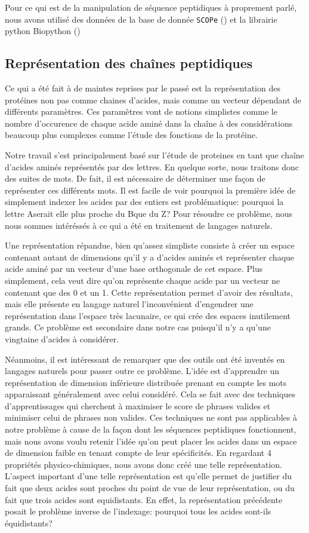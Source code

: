 \documentclass[a4paper,11pt]{article}
\begin{document}
Pour ce qui est de la manipulation de séquence peptidiques à proprement parlé,
nous avons utilisé des données de la base de donnée \texttt{SCOPe}
(\cite{fox2014scope}) et la librairie python Biopython (\cite{Cock01062009})

\subsection{Représentation des chaînes peptidiques}

Ce qui a été fait à de maintes reprises par le passé est la représentation des
protéines non pas comme chaines d'acides, mais comme un vecteur dépendant de
différents paramètres. Ces paramètres vont de notions simplistes comme le nombre
d'occurence de chaque acide aminé dans la chaîne à des considérations beaucoup
plus complexes comme l'étude des fonctions de la protéine.

Notre travail s'est principalement basé sur l'étude de proteines en tant que
chaîne d'acides aminés représentés par des lettres. En quelque sorte, nous traitons donc des suites de \og
mots\fg. De fait, il est nécessaire de déterminer une façon de représenter ces
différents mots. Il est facile de voir pourquoi la première idée de simplement
indexer les acides par des entiers est problématique: pourquoi la lettre \og
A\fg serait elle plus proche du \og B\fg que du \og Z\fg? Pour résoudre ce
problème, nous nous sommes intéréssés à ce qui a été en traitement de langages
naturels.

Une représentation répandue, bien qu'assez simpliste consiste à créer un espace
contenant autant de dimensions qu'il y a d'acides aminés et représenter chaque
acide aminé par un vecteur d'une base orthogonale de cet espace. Plus
simplement, cela veut dire qu'on représente chaque acide par un vecteur ne
contenant que des 0 et un 1. Cette représentation permet d'avoir des résultats,
mais elle présente en langage naturel l'inconvénient d'engendrer une
représentation dans l'espace très lacunaire, ce qui crée des espaces inutilement
grands. Ce problème est secondaire dans notre cas puisqu'il n'y a qu'une
vingtaine d'acides à considérer.

Néanmoins, il est intéressant de remarquer que des outils ont été inventés en
langages naturels pour passer outre ce problème. L'idée est d'apprendre un
représentation de dimension inférieure distribuée prenant en compte les mots
apparaissant généralement avec celui considéré. Cela se fait avec des techniques
d'apprentissages qui cherchent à maximiser le score de phrases valides et
minimiser celui de phrases non valides. Ces techniques ne sont pas applicables à
notre problème à cause de la façon dont les séquences peptidiques fonctionnent,
mais nous avons voulu retenir l'idée qu'on peut placer les acides dans un espace
de dimension faible en tenant compte de leur spécificités. En regardant 4
propriétés physico-chimiques, nous avons donc créé une telle représentation.
L'aspect important d'une telle représentation est qu'elle permet de justifier du
fait que deux acides sont proches du point de vue de leur représentation, ou du
fait que trois acides sont equidistants. En effet, la représentation précédente
posait le problème inverse de l'indexage: pourquoi tous les acides sont-ils équidistants?
\end{document}
